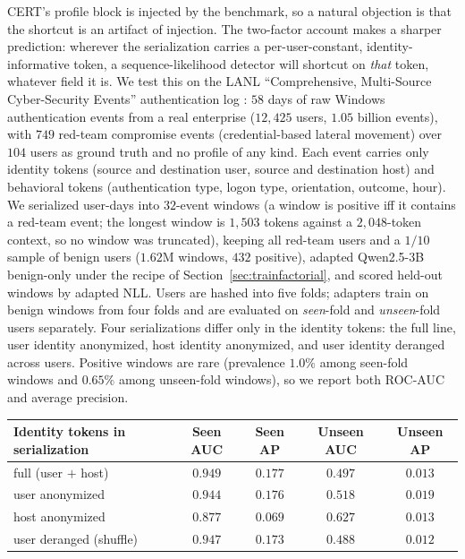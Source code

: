 \documentclass[10pt]{article} %
\begin{document}
CERT's profile block is injected by the benchmark, so a natural objection is
that the shortcut is an artifact of injection. The two-factor account makes a
sharper prediction: wherever the serialization carries a per-user-constant,
identity-informative token, a sequence-likelihood detector will shortcut on
\emph{that} token, whatever field it is. We test this on the LANL
``Comprehensive, Multi-Source Cyber-Security Events'' authentication log
\citep{kent2015comprehensive}: $58$ days of raw Windows authentication events
from a real enterprise ($12{,}425$ users, $1.05$ billion events), with $749$
red-team compromise events (credential-based lateral movement) over $104$
users as ground truth and no profile of any kind. Each event carries only identity tokens (source and
destination user, source and destination host) and behavioral tokens
(authentication type, logon type, orientation, outcome, hour). We serialized
user-days into $32$-event windows (a window is positive iff it contains a
red-team event; the longest window is $1{,}503$ tokens against a
$2{,}048$-token context, so no window was truncated), keeping all
red-team users and a $1/10$ sample of benign users ($1.62$M windows, $432$
positive), adapted Qwen2.5-3B benign-only under the recipe of
Section~\ref{sec:trainfactorial}, and scored held-out windows by adapted NLL.
Users are hashed into five folds; adapters train on benign windows from four
folds and are evaluated on \emph{seen}-fold and \emph{unseen}-fold users
separately. Four serializations differ only in the identity tokens: the full
line, user identity anonymized, host identity anonymized, and user identity
deranged across users. Positive windows are rare (prevalence $1.0\%$ among seen-fold windows and
$0.65\%$ among unseen-fold windows), so we report both ROC-AUC and average
precision.

\begin{center}
\begin{tabular}{lcccc}
\toprule
Identity tokens in serialization & Seen AUC & Seen AP & Unseen AUC & Unseen AP \\
\midrule
full (user $+$ host)     & $0.949$ & $0.177$ & $0.497$ & $0.013$ \\
user anonymized          & $0.944$ & $0.176$ & $0.518$ & $0.019$ \\
host anonymized          & $0.877$ & $0.069$ & $\mathbf{0.627}$ & $0.013$ \\
user deranged (shuffle)  & $0.947$ & $0.173$ & $0.488$ & $0.012$ \\
\bottomrule
\end{tabular}
\end{center}
\end{document}
